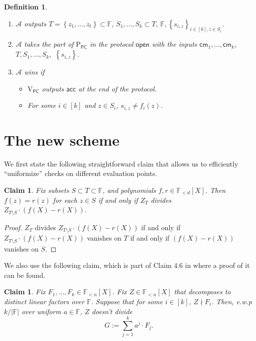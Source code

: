 \documentclass[11pt]{article} %
\newcommand{\F}{\ensuremath{\mathbb F}\xspace}
\newcommand{\adv}{\ensuremath{\mathcal A}\xspace}
\newcommand{\cm}{\ensuremath{\mathsf{cm}}\xspace}
\newcommand{\open}{\ensuremath{\mathsf{open}}\xspace}
\newcommand{\acc}{\ensuremath{\mathsf{acc}}\xspace}
\newcommand{\defeq}{:=}
\newcommand{\sett}[2]{\ensuremath{\set{#1}_{#2}}\xspace}
\newcommand{\prvpc}{\ensuremath{\mathrm{P_{\mathsf{PC}}}}\xspace}
\newcommand{\verpc}{\ensuremath{\mathrm{V_{\mathsf{PC}}}}\xspace}
\newcommand{\set}[1]{\ensuremath{\left\{#1\right\}}\xspace}
\newcommand{\polysofdeg}[1]{\ensuremath{\F_{< #1}[X]}\xspace}
\newtheorem{dfn}[lemma]{Definition}
\newtheorem{claim}[lemma]{Claim}
\begin{document}
\begin{dfn}
\begin{itemize}
\begin{itemize}
\begin{enumerate}
  \item \adv outputs $T=\set{z_1,\ldots,z_t}\subset \F$, $S_1,\ldots,S_k \subset T$,   \F$, \sett{s_{i,z}}{i\in [k],z\in S_i}$.
  \item \adv takes the part of \prvpc in the protocol \open with the inputs
  $\cm_1,\ldots,\cm_k$,$T, S_1,\ldots,S_k,$  $\set{s_{i,z}}$.
  \item $\adv$ wins if 
  \begin{itemize} 
   \item \verpc outputs \acc at the end of the protocol.
   \item For some $i\in [k]$ and  $z\in S_i$, $s_{i,z}\neq f_i(z)$.
  \end{itemize}

 \end{enumerate}

\end{itemize}
\end{itemize}
\end{dfn}


\section{The new scheme}\label{sec:main}



We first state the following straightforward claim that allows us to efficiently ``uniformize'' checks on different evaluation points.
\begin{claim}\label{clm:div}
 Fix subsets $S\subset T\subset \F$, and polynomials $f,r \in \polysofdeg{d}$.
 Then $f(z)=r(z)$ for each $z\in S$ if and only if 
 $Z_T$ divides $Z_{T\setminus S}\cdot (f(X)-r(X))$.
 
\end{claim}



\begin{proof}
 $Z_T$ divides $Z_{T\setminus S}\cdot (f(X)-r(X))$ if and only if 
 $Z_{T\setminus S}\cdot (f(X)-r(X))$ vanishes on $T$ if and only if
 $(f(X)-r(X))$ vanishes on $S$.
\end{proof}

We also use the following claim, which is part of Claim 4.6 in \cite{plonk} where a proof of it can be found.
\begin{claim}\label{clm:div_sum}
 Fix $F_1,\ldots,F_k \in \polysofdeg{n}$. Fix $Z\in \polysofdeg{n}$ that decomposes to distinct linear factors over \F. 
 Suppose that for some $i\in [k]$, $Z\nmid F_i$.
 Then, e.w.p $k/|\F|$ over uniform $a\in \F$, $Z$ doesn't divide
 \[G\defeq \sum_{j=1}^k a^j \cdot F_j.\]

\end{claim}
\end{document}
